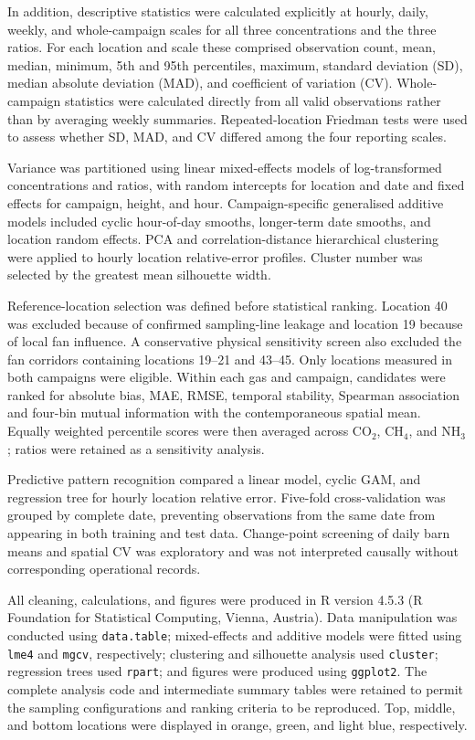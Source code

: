 \documentclass[12pt,a4paper]{article}
\begin{document}
In addition, descriptive statistics were calculated explicitly at hourly,
daily, weekly, and whole-campaign scales for all three concentrations and the
three ratios. For each location and scale these comprised observation count,
mean, median, minimum, 5th and 95th percentiles, maximum, standard deviation
(SD), median absolute deviation (MAD), and coefficient of variation (CV).
Whole-campaign statistics were calculated directly from all valid observations
rather than by averaging weekly summaries. Repeated-location Friedman tests
were used to assess whether SD, MAD, and CV differed among the four reporting
scales.

Variance was partitioned using linear mixed-effects models of log-transformed
concentrations and ratios, with random intercepts for location and date and
fixed effects for campaign, height, and hour. Campaign-specific generalised
additive models included cyclic hour-of-day smooths, longer-term date smooths,
and location random effects. PCA and correlation-distance hierarchical
clustering were applied to hourly location relative-error profiles. Cluster
number was selected by the greatest mean silhouette width.

Reference-location selection was defined before statistical ranking. Location
40 was excluded because of confirmed sampling-line leakage and location 19
because of local fan influence. A conservative physical sensitivity screen
also excluded the fan corridors containing locations 19--21 and 43--45. Only
locations measured in both campaigns were eligible. Within each gas and
campaign, candidates were ranked for absolute bias, MAE, RMSE, temporal
stability, Spearman association and four-bin mutual information with the
contemporaneous spatial mean. Equally weighted percentile scores were then
averaged across \(\mathrm{CO_2}\), \(\mathrm{CH_4}\), and
\(\mathrm{NH_3}\); ratios were retained as a sensitivity analysis.

Predictive pattern recognition compared a linear model, cyclic GAM, and
regression tree for hourly location relative error. Five-fold cross-validation
was grouped by complete date, preventing observations from the same date from
appearing in both training and test data. Change-point screening of daily barn
means and spatial CV was exploratory and was not interpreted causally without
corresponding operational records.

All cleaning, calculations, and figures were produced in R version 4.5.3
(R Foundation for Statistical Computing, Vienna, Austria). Data manipulation
was conducted using \texttt{data.table}; mixed-effects and additive models
were fitted using \texttt{lme4} and \texttt{mgcv}, respectively; clustering
and silhouette analysis used \texttt{cluster}; regression trees used
\texttt{rpart}; and figures were produced using \texttt{ggplot2}. The complete
analysis code and intermediate summary tables were retained to permit the
sampling configurations and ranking criteria to be reproduced. Top, middle,
and bottom locations were displayed in orange, green, and light blue,
respectively.
\end{document}
